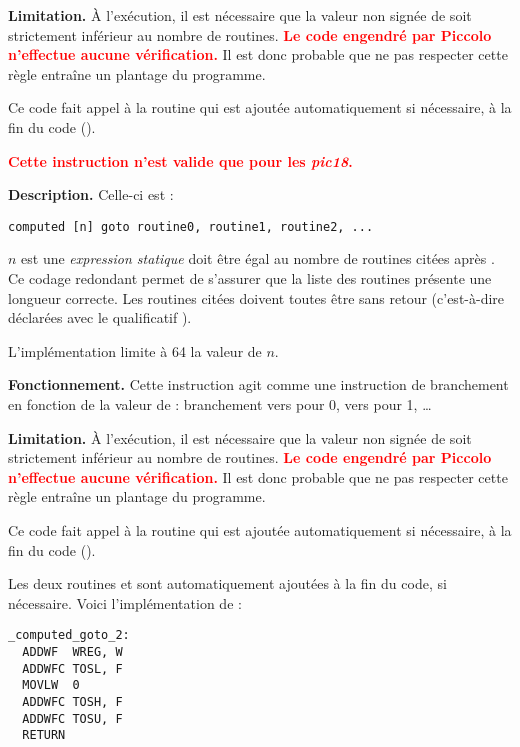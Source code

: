 \textbf{Limitation.} À l'exécution, il est nécessaire que la valeur non signée de  soit strictement inférieur au nombre de routines. \textcolor{red}{\bf Le code engendré par Piccolo n'effectue aucune vérification.} Il est donc probable que ne pas respecter cette règle entraîne un plantage du programme.

Ce code fait appel à la routine  qui est ajoutée automatiquement si nécessaire, à la fin du code (). 




\textcolor{red}{\bf Cette instruction n'est valide que pour les \emph{pic18}.}

\textbf{Description.} Celle-ci est :
\begin{lstlisting}[language=piccolo]
computed [n] goto routine0, routine1, routine2, ...
\end{lstlisting}

$n$ est une \emph{expression statique} doit être égal au nombre de routines citées après . Ce codage redondant permet de s'assurer que la liste des routines présente une longueur correcte. Les routines citées doivent toutes être sans retour (c'est-à-dire déclarées avec le qualificatif ).

L'implémentation limite à 64 la valeur de $n$.

\textbf{Fonctionnement.} Cette instruction agit comme une instruction de branchement en fonction de la valeur de  : branchement vers  pour 0, vers  pour 1, \dots 

\textbf{Limitation.} À l'exécution, il est nécessaire que la valeur non signée de  soit strictement inférieur au nombre de routines. \textcolor{red}{\bf Le code engendré par Piccolo n'effectue aucune vérification.} Il est donc probable que ne pas respecter cette règle entraîne un plantage du programme.


Ce code fait appel à la routine  qui est ajoutée automatiquement si nécessaire, à la fin du code (). 





Les deux routines  et  sont automatiquement ajoutées à la fin du code, si nécessaire. Voici l'implémentation de  :
\begin{lstlisting}[language=assembleur]
_computed_goto_2:
  ADDWF  WREG, W
  ADDWFC TOSL, F
  MOVLW  0
  ADDWFC TOSH, F
  ADDWFC TOSU, F
  RETURN
\end{lstlisting}

